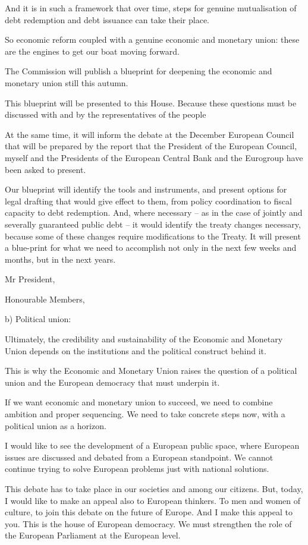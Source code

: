\documentclass[a4paper,11pt]{article}
\begin{document}
And it is in such a framework that over time, steps for genuine mutualisation of debt redemption and debt issuance can take their place.

So economic reform coupled with a genuine economic and monetary union: these are the engines to get our boat moving forward.

The Commission will publish a blueprint for deepening the economic and monetary union still this autumn.

This blueprint will be presented to this House. Because these questions must be discussed with and by the representatives of the people

At the same time, it will inform the debate at the December European Council that will be prepared by the report that the President of the European Council, myself and the Presidents of the European Central Bank and the Eurogroup have been asked to present.

Our blueprint will identify the tools and instruments, and present options for legal drafting that would give effect to them, from policy coordination to fiscal capacity to debt redemption. And, where necessary – as in the case of jointly and severally guaranteed public debt – it would identify the treaty changes necessary, because some of these changes require modifications to the Treaty. It will present a blue-print for what we need to accomplish not only in the next few weeks and months, but in the next years.

Mr President,

Honourable Members,

b) Political union:

Ultimately, the credibility and sustainability of the Economic and Monetary Union depends on the institutions and the political construct behind it.

This is why the Economic and Monetary Union raises the question of a political union and the European democracy that must underpin it.

If we want economic and monetary union to succeed, we need to combine ambition and proper sequencing. We need to take concrete steps now, with a political union as a horizon.

I would like to see the development of a European public space, where European issues are discussed and debated from a European standpoint. We cannot continue trying to solve European problems just with national solutions.

This debate has to take place in our societies and among our citizens. But, today, I would like to make an appeal also to European thinkers. To men and women of culture, to join this debate on the future of Europe. And I make this appeal to you. This is the house of European democracy. We must strengthen the role of the European Parliament at the European level.
\end{document}
